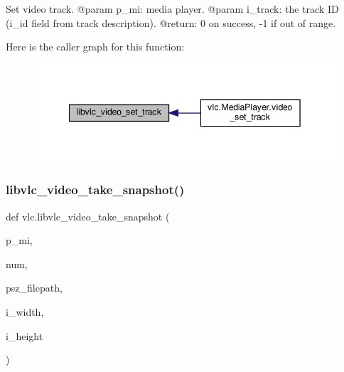\begin{DoxyVerb}Set video track.
@param p_mi: media player.
@param i_track: the track ID (i_id field from track description).
@return: 0 on success, -1 if out of range.
\end{DoxyVerb}
 Here is the caller graph for this function\+:
\nopagebreak
\begin{figure}[H]
\begin{center}
\leavevmode
\includegraphics[width=342pt]{namespacevlc_a5a93e0861484a0b67acaf7e76601edcb_icgraph}
\end{center}
\end{figure}
\mbox{\label{namespacevlc_a0c671a906d1cdfe68ca7e1cb644a3bee}} 
\subsubsection{\texorpdfstring{libvlc\+\_\+video\+\_\+take\+\_\+snapshot()}{libvlc\_video\_take\_snapshot()}}
{\footnotesize\ttfamily def vlc.\+libvlc\+\_\+video\+\_\+take\+\_\+snapshot (\begin{DoxyParamCaption}\item[{}]{p\+\_\+mi,  }\item[{}]{num,  }\item[{}]{psz\+\_\+filepath,  }\item[{}]{i\+\_\+width,  }\item[{}]{i\+\_\+height }\end{DoxyParamCaption})}

